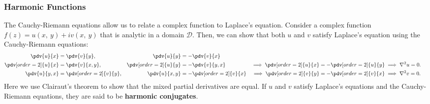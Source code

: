 \documentclass{article}
\begin{document}
\subsubsection{Harmonic Functions}
The Cauchy-Riemann equations allow us to relate a complex function to
Laplace's equation. Consider a complex function \(f\left( z \right) =
u\left( x,\: y \right) + i v\left( x,\: y \right)\) that is analytic in
a domain \(\mathcal{D}\). Then, we can show that both \(u\) and \(v\)
satisfy Laplace's equation using the Cauchy-Riemann equations:
\begin{align*}
    \pdv{u}{x}          & = \pdv{v}{y},          & \pdv{u}{y}          & = -\pdv{v}{x}                                                                                           \\
    \pdv[order=2]{u}{x} & = \pdv{v}{x,y},        & \pdv[order=2]{u}{y} & = -\pdv{v}{y,x}        & \implies \pdv[order=2]{u}{x} = -\pdv[order=2]{u}{y} & \implies \nabla^2 u = 0. \\
    \pdv{u}{y,x}        & = \pdv[order=2]{v}{y}, & \pdv{u}{x,y}        & = -\pdv[order=2]{v}{x} & \implies \pdv[order=2]{v}{y} = -\pdv[order=2]{v}{x} & \implies \nabla^2 v = 0.
\end{align*}
Here we use Clairaut's theorem to show that the mixed partial derivatives
are equal. If \(u\) and \(v\) satisfy Laplace's equations and the
Cauchy-Riemann equations, they are said to be \textbf{harmonic
    conjugates}.
\end{document}
